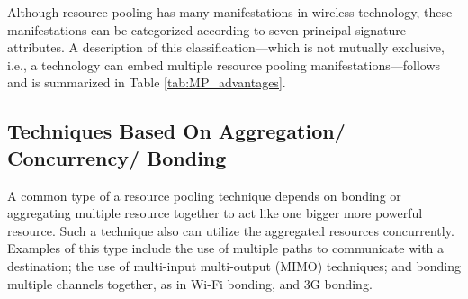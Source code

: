 \documentclass{sigcomm-alternate}
\begin{document}
Although resource pooling has many manifestations in wireless technology, these manifestations can be categorized according to seven principal signature attributes. A description of this classification---which is not mutually exclusive, i.e., a technology can embed multiple resource pooling manifestations---follows and is summarized in Table \ref{tab:MP_advantages}. 

\subsection{Techniques Based On Aggregation/ Concurrency/ Bonding}

A common type of a resource pooling technique depends on bonding or aggregating multiple resource together to act like one bigger more powerful resource.   Such a technique also can utilize the aggregated resources concurrently. Examples of this type include the use of multiple paths to communicate with a destination; the use of multi-input multi-output (MIMO) techniques; and bonding multiple channels together, as in Wi-Fi bonding, and 3G bonding.
\end{document}
